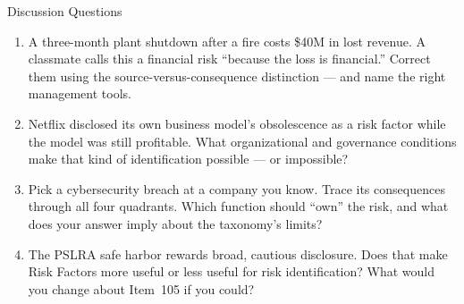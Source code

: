 \documentclass[11pt, aspectratio=169]{beamer}
\begin{document}
\begin{frame}{Discussion Questions}
\begin{enumerate}
  \item A three-month plant shutdown after a fire costs \$40M in lost revenue. A classmate calls this a financial risk ``because the loss is financial.'' Correct them using the source-versus-consequence distinction --- and name the right management tools.
  \item Netflix disclosed its own business model's obsolescence as a risk factor while the model was still profitable. What organizational and governance conditions make that kind of identification possible --- or impossible?
  \item Pick a cybersecurity breach at a company you know. Trace its consequences through all four quadrants. Which function should ``own'' the risk, and what does your answer imply about the taxonomy's limits?
  \item The PSLRA safe harbor rewards broad, cautious disclosure. Does that make Risk Factors more useful or less useful for risk identification? What would you change about Item~105 if you could?
\end{enumerate}
\end{frame}
\end{document}

